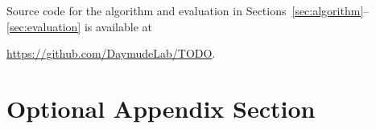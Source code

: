 \documentclass[acmsmall,nonacm,screen]{acmart}  %
\newif\ifanon
\newif\ifcomment
\newcommand{\redcomment}[1]{\ifcomment\color{red} #1 \color{black}\fi}
\renewcommand{\todo}[1]{\redcomment{TODO: #1}}
\begin{document}
Source code for the algorithm and evaluation in Sections~\ref{sec:algorithm}--\ref{sec:evaluation} is available at
\ifanon
[URL omitted for blind review].
\else
\url{https://github.com/DaymudeLab/TODO}.
\fi




\begin{acks}
    \todo{Funding acknowledgements, automatically suppressed in anonymous mode.}
\end{acks}










\appendix

\section{Optional Appendix Section} \label{app:todo}

\todo{}
\end{document}
